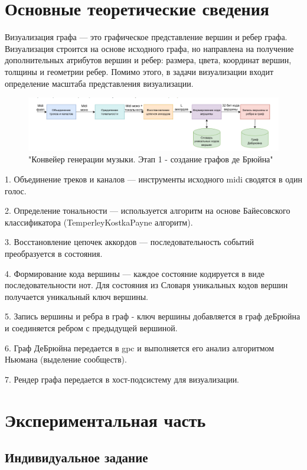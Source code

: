 \chapter{Основные теоретические сведения}
Визуализация графа — это графическое представление вершин и ребер графа. Визуализация строится на основе исходного графа, но направлена на получение дополнительных атрибутов вершин и ребер: размера, цвета, координат вершин, толщины и геометрии ребер. Помимо этого, в задачи визуализации входит определение масштаба представления визуализации.

\begin{figure}[h!]
	\centering
	\includegraphics[scale=0.5]{img/1.png} %
	\caption{"Конвейер генерации музыки. Этап 1 - создание графов де Брюйна"}
	\label{img:test}
\end{figure}

1. Объединение треков и каналов — инструменты исходного midi сводятся в один голос.

2. Определение тональности — используется алгоритм на основе Байесовского классификатора (TemperleyKostkaPayne алгоритм).

3. Восстановление цепочек аккордов — последовательность событий преобразуется в состояния.

4. Формирование кода вершины — каждое состояние кодируется в виде последовательности нот. Для состояния из Словаря уникальных кодов вершин получается уникальный ключ вершины.

5. Запись вершины и ребра в граф - ключ вершины добавляется в граф деБрюйна и соединяется ребром с предыдущей вершиной.

6. Граф ДеБрюйна передается в gpc и выполняется его анализ алгоритмом Ньюмана (выделение сообществ).

7. Рендер графа передается в хост-подсистему для визуализации.
\chapter{Экспериментальная часть}

\section{Индивидуальное задание}

